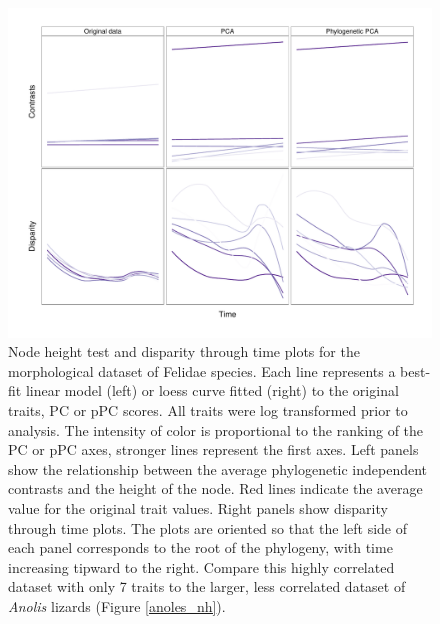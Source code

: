 \documentclass[a4paper,11pt]{article}
\begin{document}
\begin{figure}[p]
\centering
\includegraphics[scale=0.65]{fig/felidae_nh-dtt.pdf}
\caption{Node height test and disparity through time plots for the morphological dataset of Felidae species. Each line represents a best-fit linear model (left) or loess curve fitted (right) to the original traits, PC or pPC scores. All traits were log transformed prior to analysis. The intensity of color is proportional to the ranking of the PC or pPC axes, stronger lines represent the first axes. Left panels show the relationship between the average phylogenetic independent contrasts and the height of the node. Red lines indicate the average value for the original trait values. Right panels show disparity through time plots. The plots are oriented so that the left side of each panel corresponds to the root of the phylogeny, with time increasing tipward to the right. Compare this highly correlated dataset with only 7 traits to the larger, less correlated dataset of \textit{Anolis} lizards (Figure \ref{anoles_nh}).}
\label{felidae.nh}
\end{figure}
\end{document}
